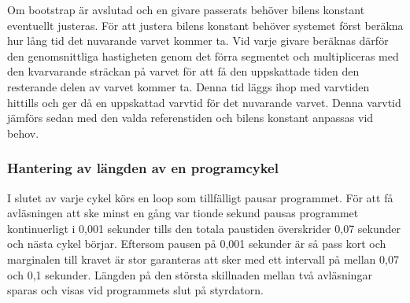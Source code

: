 Om bootstrap är avslutad och en givare passerats behöver bilens konstant
eventuellt justeras. För att justera bilens konstant behöver systemet först
beräkna hur lång tid det nuvarande varvet kommer ta. Vid varje givare beräknas
därför den genomsnittliga hastigheten genom det förra segmentet och
multipliceras med den kvarvarande sträckan på varvet för att få den uppskattade
tiden den resterande delen av varvet kommer ta. Denna tid läggs ihop med
varvtiden hittills och ger då en uppskattad varvtid för det nuvarande varvet.
Denna varvtid jämförs sedan med den valda referenstiden och bilens konstant
anpassas vid behov.

%  



\subsubsection{Hantering av längden av en programcykel}
\label{sec:system:korning:cykel}

I slutet av varje cykel körs en loop som tillfälligt pausar programmet. För att
få avläsningen att ske minst en gång var tionde sekund pausas programmet
kontinuerligt i 0,001 sekunder tills den totala paustiden överskrider 0,07
sekunder och nästa cykel börjar. Eftersom pausen på 0,001 sekunder är så pass
kort och marginalen till kravet är stor garanteras att sker med ett intervall på
mellan 0,07 och 0,1 sekunder. Längden på den största skillnaden mellan två
avläsningar sparas och visas vid programmets slut på styrdatorn.

